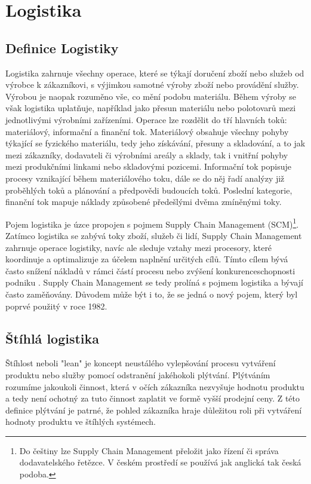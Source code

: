 \chapter{Logistika}

\section{Definice Logistiky}

Logistika zahrnuje všechny operace, které se týkají doručení zboží nebo služeb od výrobce k zákazníkovi, s výjimkou samotné výroby zboží nebo provádění služby. Výrobou je naopak rozuměno vše, co mění podobu materiálu.
Během výroby se však logistika uplatňuje, například jako přesun materiálu nebo polotovarů mezi jednotlivými výrobními zařízeními. 
Operace lze rozdělit do tří hlavních toků: materiálový, informační a finanční tok. Materiálový obsahuje všechny pohyby týkající se fyzického materiálu, tedy jeho získávání, přesuny a skladování, a to jak mezi zákazníky, dodavateli či výrobními areály a sklady, tak i vnitřní pohyby mezi produkčními linkami nebo skladovými pozicemi. Informační tok popisuje procesy vznikající během materiálového toku, dále se do něj řadí analýzy již proběhlých toků a plánování a předpovědi budoucích toků. Poslední kategorie, finanční tok mapuje náklady způsobené předešlými dvěma zmíněnými toky.\cite{bib:Baudin}

Pojem logistika je úzce propojen s pojmem Supply Chain Management (SCM)\footnote{Do češtiny lze Supply Chain Management přeložit jako řízení či správa dodavatelského řetězce. V českém prostředí se používá jak anglická tak česká podoba.}. Zatímco logistika se zabývá toky zboží, služeb či lidí, Supply Chain Management zahrnuje operace logistiky, navíc ale sleduje vztahy mezi procesory, které koordinuje a optimalizuje za účelem naplnění určitých cílů. Tímto cílem bývá často snížení nákladů v rámci částí procesu nebo zvýšení konkurenceschopnosti podniku \cite{bib:IIMudaipur}. Supply Chain Management se tedy prolíná s pojmem logistika a bývají často zaměňovány. Důvodem může být i to, že se jedná o nový pojem, který byl poprvé použitý v roce 1982.\cite{bib:Christopher} 

\section{Štíhlá logistika}

Štíhlost neboli "lean" je koncept neustálého vylepšování procesu vytváření produktu nebo služby pomocí odstranění jakéhokoli plýtvání. Plýtváním rozumíme jakoukoli činnost, která v očích zákazníka nezvyšuje hodnotu produktu a tedy není ochotný za tuto činnost zaplatit ve formě vyšší prodejní ceny. Z této definice plýtvání je patrné, že pohled zákazníka hraje důležitou roli při vytváření hodnoty produktu ve štíhlých systémech.\cite{bib:LW1, LW2}

